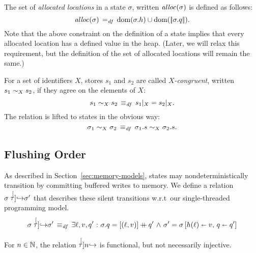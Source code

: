 \documentclass[11pt]{report}
\begin{document}
The set of \emph{allocated locations} in a state $\sigma$, written $\mathit{alloc}(\sigma)$ is defined as follows: \[ \mathit{alloc}(\sigma) \operatorname{\;=_{\mathit{df}}\;} \operatorname{\mathrm{dom}}(\sigma.h) \cup \operatorname{\mathrm{dom}}(|\!|\sigma.q|\!|). \] Note that the above constraint on the definition of a state implies that every allocated location has a defined value in the heap. (Later, we will relax this requirement, but the definition of the set of allocated locations will remain the same.)


For a set of identifiers $X$, stores $s_1$ and $s_2$ are called \emph{$X$-congruent}, written $s_1 \sim_{X} s_2$, if they agree on the elements of $X$: \[ s_1 \sim_{X} s_2 \operatorname{\;\equiv_{\mathit{df}}\;} s_1 |_{X} = s_2 |_{X}. \] The relation is lifted to states in the obvious way: \[ \sigma_1 \sim_{X} \sigma_2 \operatorname{\;\equiv_{\mathit{df}}\;} \sigma_1.s \sim_{X} \sigma_2.s.\]


\subsection{Flushing Order} %
\label{sub:flushing}

As described in Section~\ref{sec:memory-models}, states may nondeterministically transition by committing buffered writes to memory. We define a relation $\sigma \stackrel[\tau]{}{\operatorname{\hookrightarrow}} \sigma'$ that describes these silent transitions w.r.t~our single-threaded programming model.
\begin{equation}
\begin{split}
	\label{eq:taustepat}
	\sigma \stackrel[\tau]{}{\operatorname{\hookrightarrow}} \sigma' \operatorname{\;\equiv_{\mathit{df}}\;} {} & \exists \ell, v, q' \operatorname{\,:\,} \sigma.q = \left[(\ell,v)\right]\operatorname{+\!\!\!+} q' \operatorname{\,\wedge\,} \sigma' = \sigma \left[ h(\ell) \shortleftarrow v,\,q \shortleftarrow q' \right] \\
\end{split}
\end{equation}

\begin{lemma}
	\label{lem:tau-functional}
	For $n \in \mathbb{N}$, the relation $\stackrel[\tau]{n}{\operatorname{\hookrightarrow}}$ is functional, but not necessarily injective.
\end{lemma}
\end{document}
